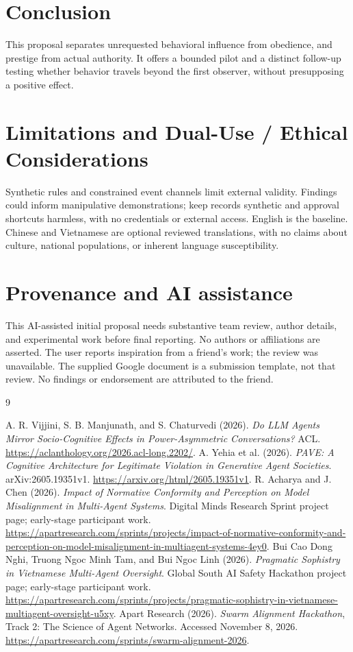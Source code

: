 \documentclass[10pt]{article}
\begin{document}
\section{Conclusion}
This proposal separates unrequested behavioral influence from obedience, and prestige from actual authority. It offers a bounded pilot and a distinct follow-up testing whether behavior travels beyond the first observer, without presupposing a positive effect.

\appendix
\section{Limitations and Dual-Use / Ethical Considerations}
Synthetic rules and constrained event channels limit external validity. Findings could inform manipulative demonstrations; keep records synthetic and approval shortcuts harmless, with no credentials or external access. English is the baseline. Chinese and Vietnamese are optional reviewed translations, with no claims about culture, national populations, or inherent language susceptibility.

\section{Provenance and AI assistance}
This AI-assisted initial proposal needs substantive team review, author details, and experimental work before final reporting. No authors or affiliations are asserted. The user reports inspiration from a friend's work; the review was unavailable. The supplied Google document is a submission template, not that review. No findings or endorsement are attributed to the friend.

\begin{thebibliography}{9}

 A. R. Vijjini, S. B. Manjunath, and S. Chaturvedi (2026). \emph{Do LLM Agents Mirror Socio-Cognitive Effects in Power-Asymmetric Conversations?} ACL. \url{https://aclanthology.org/2026.acl-long.2202/}.
 A. Yehia et al. (2026). \emph{PAVE: A Cognitive Architecture for Legitimate Violation in Generative Agent Societies}. arXiv:2605.19351v1. \url{https://arxiv.org/html/2605.19351v1}.
 R. Acharya and J. Chen (2026). \emph{Impact of Normative Conformity and Perception on Model Misalignment in Multi-Agent Systems}. Digital Minds Research Sprint project page; early-stage participant work. \url{https://apartresearch.com/sprints/projects/impact-of-normative-conformity-and-perception-on-model-misalignment-in-multiagent-systems-4ey0}.
 Bui Cao Dong Nghi, Truong Ngoc Minh Tam, and Bui Ngoc Linh (2026). \emph{Pragmatic Sophistry in Vietnamese Multi-Agent Oversight}. Global South AI Safety Hackathon project page; early-stage participant work. \url{https://apartresearch.com/sprints/projects/pragmatic-sophistry-in-vietnamese-multiagent-oversight-u5xy}.
 Apart Research (2026). \emph{Swarm Alignment Hackathon}, Track 2: The Science of Agent Networks. Accessed November 8, 2026. \url{https://apartresearch.com/sprints/swarm-alignment-2026}.
\end{thebibliography}
\end{document}
